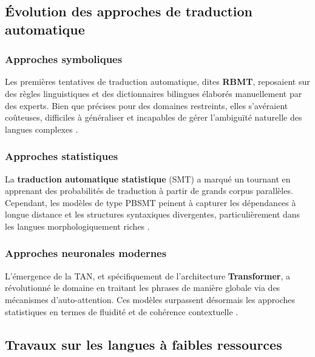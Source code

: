 \subsection{Évolution des approches de traduction automatique}

\subsubsection{Approches symboliques}

Les premières tentatives de traduction automatique, dites \textbf{\ac{RBMT}}, reposaient sur des règles linguistiques et des dictionnaires bilingues élaborés manuellement par des experts. Bien que précises pour des domaines restreints, elles s'avéraient coûteuses, difficiles à généraliser et incapables de gérer l'ambiguïté naturelle des langues complexes \cite{ranathunga2023neural, gangar2021hindi}.

\subsubsection{Approches statistiques}

La \textbf{traduction automatique statistique} (\ac{SMT}) a marqué un tournant en apprenant des probabilités de traduction à partir de grands corpus parallèles. Cependant, les modèles de type \ac{PBSMT} peinent à capturer les dépendances à longue distance et les structures syntaxiques divergentes, particulièrement dans les langues morphologiquement riches \cite{lalrempuii2021improved, chanambam2022}.

\subsubsection{Approches neuronales modernes}

L'émergence de la \ac{TAN}, et spécifiquement de l'architecture \textbf{Transformer}, a révolutionné le domaine en traitant les phrases de manière globale via des mécanismes d'auto-attention. Ces modèles surpassent désormais les approches statistiques en termes de fluidité et de cohérence contextuelle \cite{vaswani2017attention, ranathunga2023neural}.

\subsection{Travaux sur les langues à faibles ressources}

